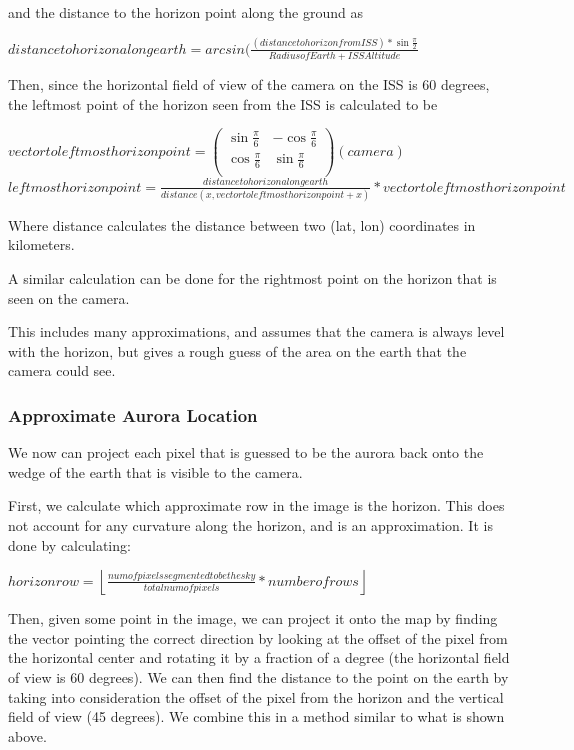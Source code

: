 \documentclass[12pt]{article}
\newcommand{\floor}[1]{\left\lfloor #1 \right\rfloor}
\theoremstyle{definition}
\begin{document}
and the distance to the horizon point along the ground as
\begin{center}
$distance to horizon along earth = arcsin( \frac{(distance to horizon from ISS) * \sin{\frac{\pi}{2}} }{ Radius of Earth + ISS Altitude }$
\end{center}

Then, since the horizontal field of view of the camera on the ISS is 60 degrees, the leftmost point of the horizon seen from the ISS is calculated to be
\begin{center}
$vector to leftmost horizon point = \left(
\begin{array}{cc}
\sin{\frac{\pi}{6}} & -\cos{\frac{\pi}{6}} \\
\cos{\frac{\pi}{6}} & \sin{\frac{\pi}{6}}\\
\end{array}
\right)
(camera)$\\
$ leftmost horizon point = \frac{distance to horizon along earth}{distance( x, vector to leftmost horizon point + x )} * vector to leftmost horizon point $
\end{center}

Where distance calculates the distance between two (lat, lon) coordinates in kilometers.

A similar calculation can be done for the rightmost point on the horizon that is seen on the camera.

This includes many approximations, and assumes that the camera is always level with the horizon, but gives a rough guess of the area on the earth that the camera could see.

\subsubsection { \bf Approximate Aurora Location }

We now can project each pixel that is guessed to be the aurora back onto the wedge of the earth that is visible to the camera.

First, we calculate which approximate row in the image is the horizon.  This does not account for any curvature along the horizon, and is an approximation.  It is done by calculating:
\begin{center}
$horizon row = \floor{\frac{num of pixels segmented to be the sky}{total num of pixels} * number of rows }$
\end{center}

Then, given some point in the image, we can project it onto the map by finding the vector pointing the correct direction by looking at the offset of the pixel from the horizontal center and rotating it by a fraction of a degree (the horizontal field of view is 60 degrees).  We can then find the distance to the point on the earth by taking into consideration the offset of the pixel from the horizon and the vertical field of view (45 degrees).  We combine this in a method similar to what is shown above. 
\end{document}
